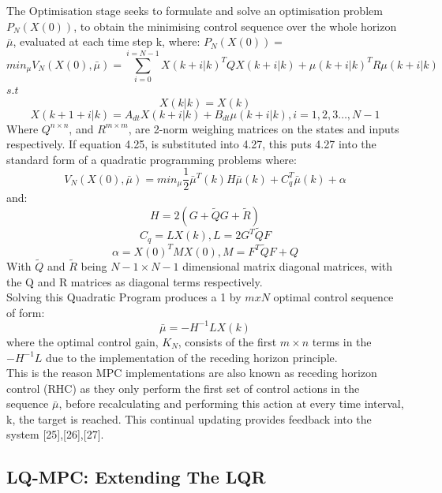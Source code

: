 \documentclass[12pt,a4paper,twoside]{report}
\begin{document}
				\space
				The Optimisation stage seeks to formulate and solve an optimisation problem \(P_N(X(0))\), to obtain the minimising control sequence over the whole horizon $\bar{\mu}$, evaluated at each time step k, where:
				\(P_N(X(0)) = \)				
				\begin{equation}
					min_\mu  V_N(X(0),\bar{\mu}) = \sum_{i = 0}^{i = N-1} X(k+i|k)^{T} Q X(k+i|k) + \mu(k+i|k)^{T} R \mu(k+i|k)
				\end{equation}
				\(s.t\)
				\[
					X(k|k) = X(k)
				\]
				\[
					X(k+1+i|k) = A_{dt}X(k+i|k) + B_{dt} \mu(k+i|k) , i=1,2,3\dots,N-1
				\]
				Where $Q^{n \times n}$, and $R^{m \times m}$, are 2-norm weighing matrices on the states and inputs respectively. If equation 4.25, is substituted into 4.27, this puts 4.27 into the standard form of a quadratic programming problems where:
				\begin{equation}
					V_N(X(0),\bar{\mu}) = min_\mu \frac{1}{2} \bar{\mu}^{T}(k) H \bar{\mu}(k) + C_q^{T}\bar{\mu}(k) + \alpha
				\end{equation}
				and:
					\[H = 2(G + \tilde{Q}G + \tilde{R})\]
					\[C_q = L X(k) , L = 2 G^{T} \tilde{Q} F\]
				\begin{equation}
					\alpha = X(0)^{T} M X(0), M = F^{T} \tilde{Q} F + Q
				\end{equation}
				With \( \tilde{Q} \) and \(\tilde{R}\) being \(N-1 \times N-1\) dimensional matrix diagonal matrices, with the Q and R matrices as diagonal terms respectively.
				\\
				Solving this Quadratic Program produces a 1 by $mxN$ optimal control sequence of form:
				\begin{equation}
					\bar{\mu }= -H^{-1} L X(k)
				\end{equation}
				where the optimal control gain, $K_N$, consists of the first $m \times n$ terms in the $-H^{-1} L$ due to the implementation of the receding horizon principle. 
				\\
				This is the reason MPC implementations are also known as receding horizon control (RHC) as they only perform the first set of control actions in the sequence $\bar{\mu}$, before recalculating and performing this action at every time interval, k, the target is reached. This continual updating provides feedback into the system [25],[26],[27]. 
				
			\subsection{LQ-MPC: Extending The LQR}
				
\end{document}

